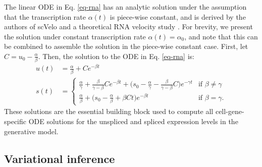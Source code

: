 \documentclass[
  sn-mathphys-num,
  lineno,
  twocolumn]{sn-jnl}
\begin{document}
The linear ODE in Eq. \ref{eq-rna} has an analytic solution under the
assumption that the transcription rate \(\alpha(t)\) is piece-wise
constant, and is derived by the authors of scVelo and a theoretical RNA
velocity study \citep{Bergen2020-pj, Li2021-qa}. For brevity, we present
the solution under constant transcription rate \(\alpha(t) = \alpha_0\),
and note that this can be combined to assemble the solution in the
piece-wise constant case. First, let \(C = u_0 - \frac{\alpha}{\beta}\).
Then, the solution to the ODE in Eq. \ref{eq-rna} is: \begin{equation}
\label{eq-rna-solution}
\begin{aligned}
  u(t) &= \frac{\alpha}{\beta} + C e^{-\beta t} \\
  s(t) &= \begin{cases}
    \frac{\alpha}{\gamma} + \frac{\beta}{\gamma - \beta} C e^{-\beta t} + \Big(s_0 - \frac{\alpha}{\gamma} - \frac{\beta}{\gamma - \beta} C\Big) e^{-\gamma t} & \text{if } \beta \neq \gamma \\
    \frac{\alpha}{\beta} + \Big(s_0 - \frac{\alpha}{\beta} + \beta C t\Big) e^{-\beta t} & \text{if } \beta = \gamma.
  \end{cases}
\end{aligned}
\end{equation} These solutions are the essential building block used to
compute all cell-gene-specific ODE solutions for the unspliced and
spliced expression levels in the generative model.

\subsection{Variational inference}\label{sec-methods-inference}
\end{document}
